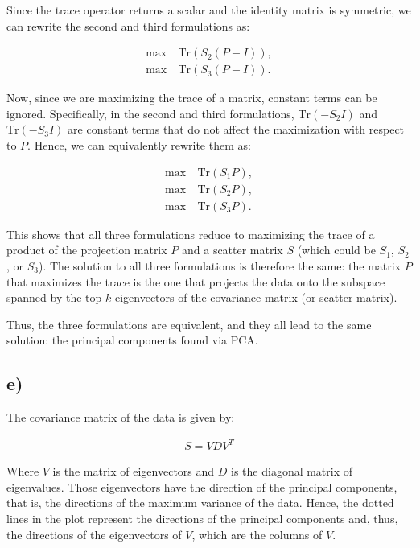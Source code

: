 \documentclass[12pt,a4paper,oneside]{paper}
\begin{document}
Since the trace operator returns a scalar and the identity matrix is symmetric, we can rewrite the second and third formulations as:

\[
\begin{aligned}
    \max &\ \text{Tr}(S_2 (P - I)), \\
    \max &\ \text{Tr}(S_3 (P - I)).
\end{aligned}
\]

Now, since we are maximizing the trace of a matrix, constant terms can be ignored. Specifically, in the second and third formulations, \( \text{Tr}(-S_2 I) \) and \( \text{Tr}(-S_3 I) \) are constant terms that do not affect the maximization with respect to \( P \). Hence, we can equivalently rewrite them as:

\[
\begin{aligned}
    \max &\ \text{Tr}(S_1 P), \\
    \max &\ \text{Tr}(S_2 P), \\
    \max &\ \text{Tr}(S_3 P).
\end{aligned}
\]

This shows that all three formulations reduce to maximizing the trace of a product of the projection matrix \( P \) and a scatter matrix \( S \) (which could be \( S_1 \), \( S_2 \), or \( S_3 \)). The solution to all three formulations is therefore the same: the matrix \( P \) that maximizes the trace is the one that projects the data onto the subspace spanned by the top \( k \) eigenvectors of the covariance matrix (or scatter matrix). 

Thus, the three formulations are equivalent, and they all lead to the same solution: the principal components found via PCA.

\newpage
\subsection*{e)}

The covariance matrix of the data is given by:

\begin{align*}
    S = V D V^T
\end{align*}

Where \( V \) is the matrix of eigenvectors and \( D \) is the diagonal matrix of eigenvalues.
Those eigenvectors have the direction of the principal components, that is, the directions of the maximum variance of the data.
Hence, the dotted lines in the plot represent the directions of the principal components and, thus,
the directions of the eigenvectors of $V$, which are the columns of $V$.
\end{document}
